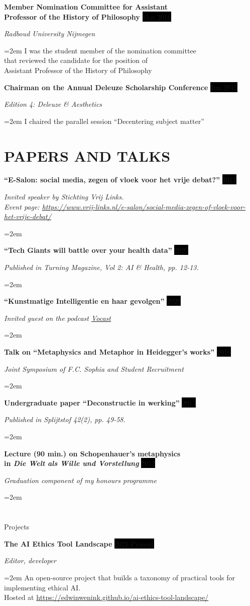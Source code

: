 \documentclass{article}
\newcommand{\sepspace}{\vspace*{1em}}		%
\newcommand{\NewPart}[1]{\section*{\uppercase{#1}}}
\newcommand{\EducationEntry}[4]{
		\noindent \textbf{#1} \hfill      %
		\colorbox{Black}{%
			\parbox{6em}{%
			\hfill\color{White}#2}} \par  %
		\noindent \textit{#3} \par        %
		\noindent\hangindent=2em\hangafter=0 \small #4 %
		\normalsize \par}
\newcommand{\WorkEntry}[4]{				  %
		\noindent \textbf{#1} \hfill      %
		\colorbox{Black}{\color{White}#2} \par  %
		\noindent \textit{#3} \par              %
		\noindent\hangindent=2em\hangafter=0 \small #4 %
		\normalsize \par}
\begin{document}
\WorkEntry{Member Nomination Committee for Assistant\\ Professor of the History of Philosophy}{Mar.2016}{Radboud University Nijmegen}{I was the student member of the nomination committee\\ that reviewed the candidate for the position of\\ Assistant Professor of the History of Philosophy}
\sepspace

\WorkEntry{Chairman on the Annual Deleuze Scholarship Conference}{Jun.2015}{Edition 4: Deleuze \& Aesthetics}{I chaired the parallel session ``Decentering subject matter'' }
\sepspace

\NewPart{Papers and talks}

\WorkEntry{``E-Salon: social media, zegen of vloek voor het vrije debat?''}{2021}{Invited speaker by Stichting Vrij Links.\\
Event page: \url{https://www.vrij-links.nl/e-salon/social-media-zegen-of-vloek-voor-het-vrije-debat/}}
\sepspace

\WorkEntry{``Tech Giants will battle over your health data''}{2020}{Published in \textit{Turning Magazine}, Vol 2: AI \& Health, pp. 12-13.}
\sepspace

\WorkEntry{``Kunstmatige Intelligentie en haar gevolgen''}{2020}{Invited guest on the podcast \href{https://vocast.live/aflevering/kunstmatige-intelligentie/}{Vocast}}
\sepspace

\WorkEntry{Talk on ``Metaphysics and Metaphor in Heidegger's works''}{2016}{Joint Symposium of F.C. Sophia and Student Recruitment}
\sepspace

\WorkEntry{Undergraduate paper ``Deconstructie in werking''}{2013}{Published in \textit{Splijtstof} 42(2), pp. 49-58.}
\sepspace

\WorkEntry{Lecture (90 min.) on Schopenhauer's metaphysics\\
in \textit{Die Welt als Wille und Vorstellung}}{2012}{Graduation component of my honours programme}

\NewPart{Projects}{}

\WorkEntry{The AI Ethics Tool Landscape}{2021-Present}{Editor, developer}{An open-source project that builds a taxonomy of practical tools for\\
implementing ethical AI.\\
Hosted at \url{https://edwinwenink.github.io/ai-ethics-tool-landscape/}}
\sepspace
\end{document}
